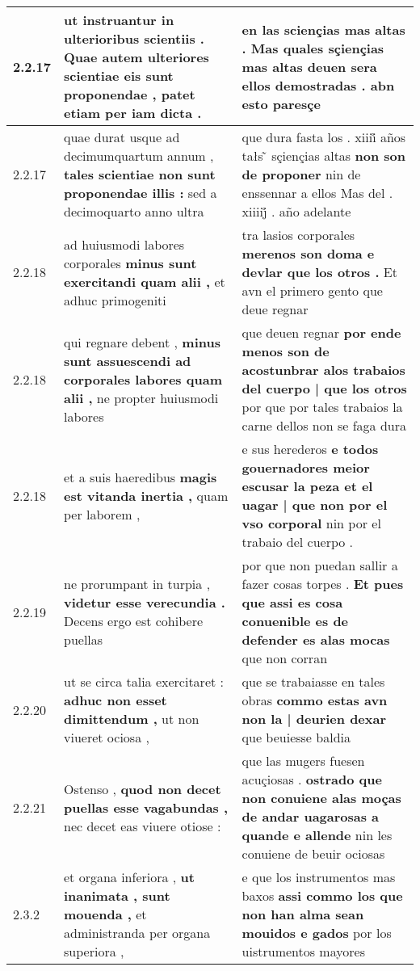 \begin{tabular}{|p{1cm}|p{6.5cm}|p{6.5cm}|}
2.2.17 & ut instruantur in ulterioribus scientiis . \textbf{ Quae autem ulteriores scientiae eis sunt proponendae , } patet etiam per iam dicta . & en las sciençias mas altas . \textbf{ Mas quales sçiençias mas altas deuen sera ellos demostradas . } abn esto paresçe \\\hline
2.2.17 & quae durat usque ad decimumquartum annum , \textbf{ tales scientiae non sunt proponendae illis : } sed a decimoquarto anno ultra & que dura fasta los . xiiii̊ años tałs ̃ sçiençias altas \textbf{ non son de proponer } nin de enssennar a ellos Mas del . xiiiij̊ . año adelante \\\hline
2.2.18 & ad huiusmodi labores corporales \textbf{ minus sunt exercitandi quam alii , } et adhuc primogeniti & tra lasios corporales \textbf{ merenos son doma e devlar que los otros . } Et avn el primero gento que deue regnar \\\hline
2.2.18 & qui regnare debent , \textbf{ minus sunt assuescendi ad corporales labores quam alii , } ne propter huiusmodi labores & que deuen regnar \textbf{ por ende menos son de acostunbrar alos trabaios del cuerpo | que los otros } por que por tales trabaios la carne dellos non se faga dura \\\hline
2.2.18 & et a suis haeredibus \textbf{ magis est vitanda inertia , } quam per laborem , & e sus herederos \textbf{ e todos gouernadores meior escusar la peza et el uagar | que non por el vso corporal } nin por el trabaio del cuerpo . \\\hline
2.2.19 & ne prorumpant in turpia , \textbf{ videtur esse verecundia . } Decens ergo est cohibere puellas & por que non puedan sallir a fazer cosas torpes . \textbf{ Et pues que assi es cosa conuenible es de defender es alas mocas } que non corran \\\hline
2.2.20 & ut se circa talia exercitaret : \textbf{ adhuc non esset dimittendum , } ut non viueret ociosa , & que se trabaiasse en tales obras \textbf{ commo estas avn non la | deurien dexar } que beuiesse baldia \\\hline
2.2.21 & Ostenso , \textbf{ quod non decet puellas esse vagabundas , } nec decet eas viuere otiose : & que las mugers fuesen acuçiosas . \textbf{ ostrado que non conuiene alas moças de andar uagarosas a quande e allende } nin les conuiene de beuir ociosas \\\hline
2.3.2 & et organa inferiora , \textbf{ ut inanimata , sunt mouenda , } et administranda per organa superiora , & e que los instrumentos mas baxos \textbf{ assi commo los que non han alma sean mouidos e gados } por los uistrumentos mayores \\\hline

\end{tabular}
